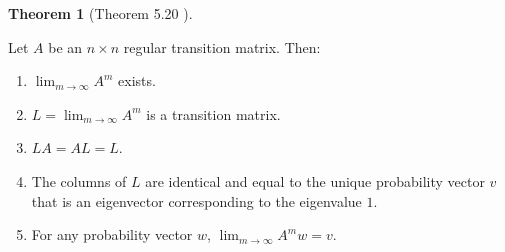 \documentclass{amsart}
\theoremstyle{definition}
\newtheorem{theorem}{Theorem}
\theoremstyle{remark}
\numberwithin{equation}{section}
\begin{document}
\begin{theorem}[Theorem 5.20 \cite{friedberg2003linear}] \label{theorem520}

Let $A$ be an $n \times n$ regular transition matrix. Then:

\begin{enumerate}


    \item $\lim_{m \to \infty} A^m$ exists.

    \item $L = \lim_{m \to \infty} A^m$ is a transition matrix.

    \item $LA = AL = L$.

    \item The columns of $L$ are identical and equal to the unique probability vector $v$ that is an eigenvector corresponding to the eigenvalue $1$.

    \item For any probability vector $w$, $\lim_{m \to \infty} A^m w = v$.

\end{enumerate}

\end{theorem}
\end{document}
